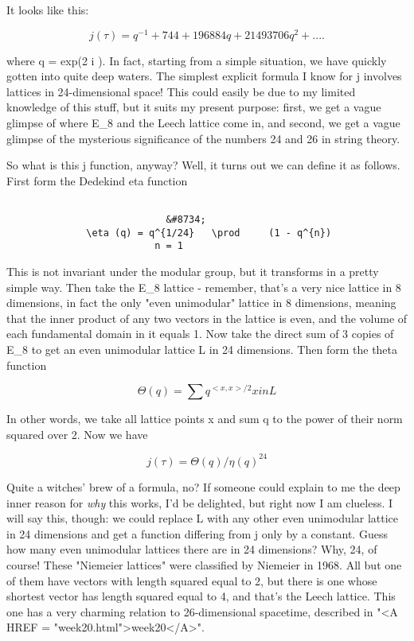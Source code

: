 It looks like this:


$$

           j(\tau ) = q^{-1} + 744 + 196884 q + 21493706 q^{2} + ....
$$
    

where q = exp(2 \pi  i \tau ).  In fact, starting from a simple situation,
we have quickly gotten into quite deep waters.  The simplest explicit
formula I know for j involves lattices in 24-dimensional space!  This
could easily be due to my limited knowledge of this stuff, but it suits
my present purpose: first, we get a vague glimpse of where E_8 and the
Leech lattice come in, and second, we get a vague glimpse of the
mysterious significance of the numbers 24 and 26 in string theory.

So what is this j function, anyway?  Well, it turns out we can define it
as follows.  First form the Dedekind eta function 


\begin{verbatim}

                            &#8734;
              \eta (q) = q^{1/24}   \prod     (1 - q^{n})
                          n = 1
\end{verbatim}
    

This is not invariant under the modular group, but it transforms in a
pretty simple way.  Then take the E_{8} lattice - remember,
that's a very nice lattice in 8 dimensions, in fact the only "even
unimodular" lattice in 8 dimensions, meaning that the inner product of
any two vectors in the lattice is even, and the volume of each
fundamental domain in it equals 1.  Now take the direct sum of 3
copies of E_{8} to get an even unimodular lattice L in 24
dimensions.  Then form the theta function


$$

                    \Theta (q)   =   \sum   q^{<x,x>/2}
                             x in L
$$
    
In other words, we take all lattice points x and sum q to the power
of their norm squared over 2.  Now we have


$$

                      j(\tau ) = \Theta (q)/\eta (q)^{24}
$$
    
Quite a witches' brew of a formula, no?  If someone could explain to me
the deep inner reason for \emph{why} this works, I'd be delighted, but right
now I am clueless.  I will say this, though: we could replace L with any
other even unimodular lattice in 24 dimensions and get a function
differing from j only by a constant.  Guess how many even unimodular
lattices there are in 24 dimensions?  Why, 24, of course!  These 
"Niemeier lattices" were classified by Niemeier in 1968.  
All but one
of them have vectors with length squared equal to 2, but there is one whose
shortest vector has length squared equal to 4, and that's the Leech lattice.
This one has a very charming relation to 26-dimensional spacetime,
described in "<A HREF = "week20.html">week20</A>".  

